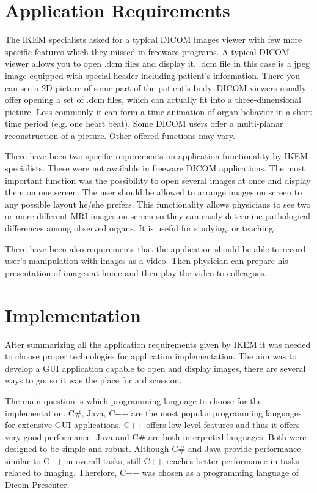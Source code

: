 \section{Application Requirements}
\label{requirements}
The IKEM specialists asked for a typical DICOM images viewer with few more specific features which they missed in freeware programs. A typical DICOM viewer allows you to open .dcm files and display it. .dcm file in this case is a jpeg image equipped with special header including patient's information. There you can see a 2D picture of some part of the patient's body. DICOM viewers usually offer opening a set of .dcm files, which can actually fit into a three-dimensional picture. Less commonly it can form a time animation of organ behavior in a short time period (e.g. one heart beat). Some DICOM users offer a multi-planar reconstruction of a picture. Other offered functions may vary.

There have been two specific requirements on application functionality by IKEM specialists. These were not available in freeware DICOM applications. The most important function was the possibility to open several images at once and display them on one screen. The user should be allowed to arrange images on screen to any possible layout he/she prefers. This functionality allows physicians to see two or more different MRI images on screen so they can easily determine pathological differences among observed organs. It is useful for studying, or teaching.

There have been also requirements that the application should be able to record user's manipulation with images as a video. Then physician can prepare his presentation of images at home and then play the video to colleagues.

\section{Implementation}
After summarizing all the application requirements given by IKEM it was needed to choose proper technologies for application implementation. The aim was to develop a GUI application capable to open and display images, there are several ways to go, so it was the place for a discussion. 

The main question is which programming language to choose for the implementation. C\#, Java, C++ are the most popular programming languages for extensive GUI applications. C++ offers low level features and thus it offers very good performance. Java and C\# are both interpreted languages. Both were designed to be simple and robust. Although C\# and Java provide performance similar to C++ in overall tasks, still C++ reaches better performance in tasks related to imaging. Therefore, C++ was chosen as a programming language of Dicom-Presenter.

